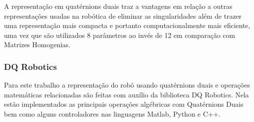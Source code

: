 A representação em quatérnions duais traz a vantagens em relação a outras representações usadas na robótica de eliminar as singularidades além de trazer uma representação mais compacta e portanto computacionalmente mais eficiente, uma vez que são utilizados 8 parâmetros ao invés de 12 em comparação com Matrizes Homogenias\cite{Adorno2011}. %

\subsubsection{DQ Robotics}

Para este trabalho a representação do robô usando quatérnions duais e operações matemáticas relacionadas são feitas com auxílio da biblioteca DQ Robotics\cite{dqrobotics2020}. Nela estão implementados as principais operações algébricas com Quatérnions Duais bem como alguns controladores nas linguagens Matlab, Python e C++.






